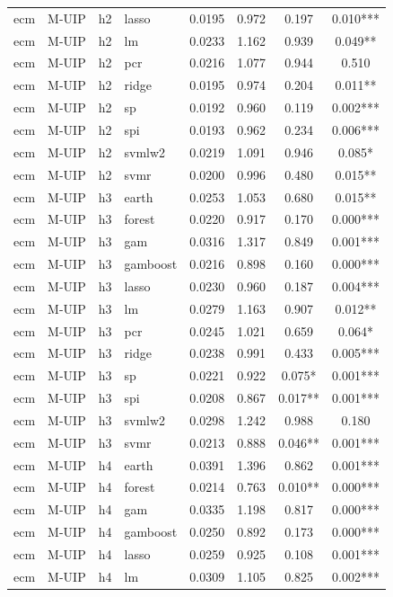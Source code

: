 \begin{ThreePartTable}
\begin{longtable}[t]{llclcccc}
ecm & M-UIP & h2 & lasso & 0.0195 & 0.972 & 0.197 & 0.010***\\
ecm & M-UIP & h2 & lm & 0.0233 & 1.162 & 0.939 & 0.049**\\
ecm & M-UIP & h2 & pcr & 0.0216 & 1.077 & 0.944 & 0.510\\
ecm & M-UIP & h2 & ridge & 0.0195 & 0.974 & 0.204 & 0.011**\\
ecm & M-UIP & h2 & sp & 0.0192 & 0.960 & 0.119 & 0.002***\\
ecm & M-UIP & h2 & spi & 0.0193 & 0.962 & 0.234 & 0.006***\\
ecm & M-UIP & h2 & svmlw2 & 0.0219 & 1.091 & 0.946 & 0.085*\\
ecm & M-UIP & h2 & svmr & 0.0200 & 0.996 & 0.480 & 0.015**\\
\addlinespace
ecm & M-UIP & h3 & earth & 0.0253 & 1.053 & 0.680 & 0.015**\\
ecm & M-UIP & h3 & forest & 0.0220 & 0.917 & 0.170 & 0.000***\\
ecm & M-UIP & h3 & gam & 0.0316 & 1.317 & 0.849 & 0.001***\\
ecm & M-UIP & h3 & gamboost & 0.0216 & 0.898 & 0.160 & 0.000***\\
ecm & M-UIP & h3 & lasso & 0.0230 & 0.960 & 0.187 & 0.004***\\
ecm & M-UIP & h3 & lm & 0.0279 & 1.163 & 0.907 & 0.012**\\
ecm & M-UIP & h3 & pcr & 0.0245 & 1.021 & 0.659 & 0.064*\\
ecm & M-UIP & h3 & ridge & 0.0238 & 0.991 & 0.433 & 0.005***\\
ecm & M-UIP & h3 & sp & 0.0221 & 0.922 & 0.075* & 0.001***\\
ecm & M-UIP & h3 & spi & 0.0208 & 0.867 & 0.017** & 0.001***\\
ecm & M-UIP & h3 & svmlw2 & 0.0298 & 1.242 & 0.988 & 0.180\\
ecm & M-UIP & h3 & svmr & 0.0213 & 0.888 & 0.046** & 0.001***\\
\addlinespace
ecm & M-UIP & h4 & earth & 0.0391 & 1.396 & 0.862 & 0.001***\\
ecm & M-UIP & h4 & forest & 0.0214 & 0.763 & 0.010** & 0.000***\\
ecm & M-UIP & h4 & gam & 0.0335 & 1.198 & 0.817 & 0.000***\\
ecm & M-UIP & h4 & gamboost & 0.0250 & 0.892 & 0.173 & 0.000***\\
ecm & M-UIP & h4 & lasso & 0.0259 & 0.925 & 0.108 & 0.001***\\
ecm & M-UIP & h4 & lm & 0.0309 & 1.105 & 0.825 & 0.002***\\

\end{longtable}
\end{ThreePartTable}

